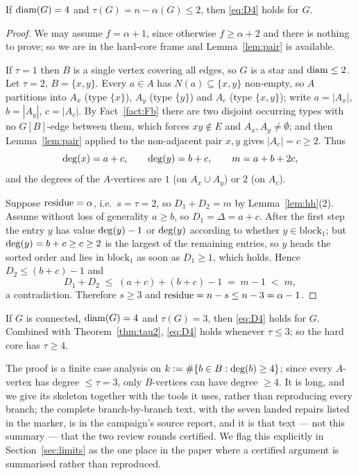 \begin{theorem}[$\tau \le 2$]\label{thm:tau2}
\Selem
If $\operatorname{diam}(G) = 4$ and $\tau(G) = n - \alpha(G) \le 2$, then \eqref{eq:D4} holds for $G$.
\end{theorem}

\begin{proof}
We may assume $f = \alpha + 1$, since otherwise $f \ge \alpha+2$ and there is nothing to
prove; so we are in the hard-core frame and Lemma~\ref{lem:pair} is available.

If $\tau = 1$ then $B$ is a single vertex covering all edges, so $G$ is a star and
$\operatorname{diam} \le 2$. Let $\tau = 2$, $B = \{x,y\}$. Every $a \in A$ has $N(a) \subseteq \{x,y\}$
non-empty, so $A$ partitions into $A_x$ (type $\{x\}$), $A_y$ (type $\{y\}$) and $A_c$
(type $\{x,y\}$); write $a = |A_x|$, $b = |A_y|$, $c = |A_c|$. By Fact~\ref{fact:Fb} there
are two disjoint occurring types with no $G[B]$-edge between them, which forces
$xy \notin E$ and $A_x, A_y \ne \emptyset$; and then Lemma~\ref{lem:pair} applied to the
non-adjacent pair $x,y$ gives $|A_c| = c \ge 2$. Thus
\[
\mathrm{deg}(x) = a + c, \qquad \mathrm{deg}(y) = b + c, \qquad m = a + b + 2c ,
\]
and the degrees of the $A$-vertices are $1$ (on $A_x \cup A_y$) or $2$ (on $A_c$).

Suppose $\operatorname{residue} = \alpha$, i.e.\ $s = \tau = 2$, so $D_1 + D_2 = m$ by
Lemma~\ref{lem:hh}(2). Assume without loss of generality $a \ge b$, so
$D_1 = \Delta = a+c$. After the first step the entry $y$ has value $\mathrm{deg}(y) - 1$ or
$\mathrm{deg}(y)$ according to whether $y \in \mathrm{block}_1$; but $\mathrm{deg}(y) = b + c \ge c \ge 2$ is
the largest of the remaining entries, so $y$ heads the sorted order and lies in
$\mathrm{block}_1$ as soon as $D_1 \ge 1$, which holds. Hence
$D_2 \le (b+c) - 1$ and
\[
D_1 + D_2 \;\le\; (a+c) + (b+c) - 1 \;=\; m - 1 \;<\; m,
\]
a contradiction. Therefore $s \ge 3$ and $\operatorname{residue} = n - s \le n - 3 = \alpha - 1$.
\end{proof}

\begin{theorem}[$\tau = 3$]\label{thm:T3}
If $G$ is connected, $\operatorname{diam}(G) = 4$ and $\tau(G) = 3$, then \eqref{eq:D4} holds for $G$.
Combined with Theorem~\ref{thm:tau2}, \eqref{eq:D4} holds whenever $\tau \le 3$; so the
hard core has $\tau \ge 4$.
\end{theorem}

The proof is a finite case analysis on
$k := \#\{b \in B : \mathrm{deg}(b) \ge 4\}$; since every $A$-vertex has degree $\le \tau = 3$, only
$B$-vertices can have degree $\ge 4$. It is long, and we give its skeleton together with
the tools it uses, rather than reproducing every branch; the complete branch-by-branch text,
with the seven landed repairs listed in the marker, is in the campaign's source report, and
it is that text --- not this summary --- that the two review rounds certified. We flag this
explicitly in Section~\ref{sec:limits} as the one place in the paper where a certified
argument is summarised rather than reproduced.

